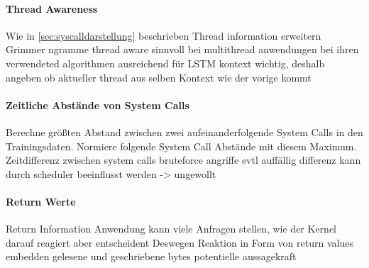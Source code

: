             \paragraph{Thread Awareness}
                Wie in \autoref{sec:syscalldarstellung} beschrieben
                Thread information erweitern
                    Grimmer ngramme thread aware sinnvoll bei multithread anwendungen 
                    bei ihren verwendeted algorithmen ausreichend
                    für LSTM kontext wichtig, deshalb angeben ob aktueller thread aus selben Kontext wie der vorige kommt

            \paragraph{Zeitliche Abstände von System Calls}
                Berechne größten Abstand zwischen zwei aufeinanderfolgende System Calls in den Trainingsdaten.
                Normiere folgende System Call Abstände mit diesem Maximum.
                Zeitdifferenz zwischen system calls
                    bruteforce angriffe evtl auffällig
                    differenz kann durch scheduler beeinflusst werden -> ungewollt

            \paragraph{Return Werte}

                Return Information
                    Anwendung kann viele Anfragen stellen, wie der Kernel darauf reagiert aber entscheident
                    Deswegen Reaktion in Form von return values embedden
                    gelesene und geschriebene bytes potentielle aussagekraft

